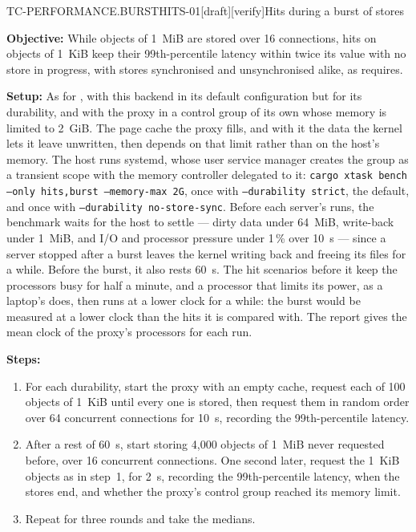 \begin{requirement}{TC-PERFORMANCE.BURSTHITS-01}[draft][verify]{Hits during a burst of stores}


  \textbf{Objective:} While objects of 1~MiB are stored over 16 connections,
  hits on objects of 1~KiB keep their 99th-percentile latency within twice
  its value with no store in progress, with stores synchronised and
  unsynchronised alike, as  requires.

  \textbf{Setup:} As for , with this
  backend in its default configuration but for its durability, and with the
  proxy in a control group of its own whose memory is limited to 2~GiB. The
  page cache the proxy fills, and with it the data the kernel lets it leave
  unwritten, then depends on that limit rather than on the host's memory.
  The host runs systemd, whose user service manager creates the group as a
  transient scope with the memory controller delegated to it:
  \texttt{cargo xtask bench --only hits,burst --memory-max 2G}, once with
  \texttt{--durability strict}, the default, and once with
  \texttt{--durability no-store-sync}. Before each server's runs, the
  benchmark waits for the host to settle --- dirty data under 64~MiB,
  write-back under 1~MiB, and I/O and processor pressure under 1\,\% over
  10~s --- since a server stopped after a burst leaves the kernel writing
  back and freeing its files for a while. Before the burst, it also rests
  60~s. The hit scenarios before it keep the processors busy for half a
  minute, and a processor that limits its power, as a laptop's does, then
  runs at a lower clock for a while: the burst would be measured at a lower
  clock than the hits it is compared with. The report gives the mean clock
  of the proxy's processors for each run.

  \textbf{Steps:}
  \begin{enumerate}
    \item For each durability, start the proxy with an empty cache, request
      each of 100 objects of 1~KiB until every one is stored, then request
      them in random order over 64 concurrent connections for 10~s,
      recording the 99th-percentile latency.
    \item After a rest of 60~s, start storing 4{,}000 objects of 1~MiB
      never requested before,
      over 16 concurrent connections. One second later, request the 1~KiB
      objects as in step~1, for 2~s, recording the 99th-percentile latency,
      when the stores end, and whether the proxy's control group reached its
      memory limit.
    \item Repeat for three rounds and take the medians.
  \end{enumerate}


\end{requirement}
